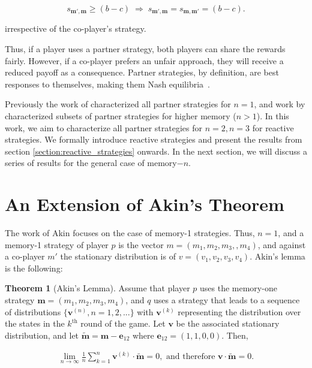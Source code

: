 \documentclass{article}
\theoremstyle{definition}
\newtheorem{theorem}{Theorem}[section]
\begin{document}
\begin{equation}\label{Eq:Partner}
    s_{\mathbf{m'},\mathbf{m}} \geq (b - c) \; \Rightarrow \; s_{\mathbf{m'},\mathbf{m}} = s_{\mathbf{m},\mathbf{m'}} = (b - c).
\end{equation}

irrespective of the co-player's strategy.

Thus, if a player uses a partner strategy, both players can share the rewards
fairly. However, if a co-player prefers an unfair approach, they will receive a
reduced payoff as a consequence. Partner strategies, by definition, are best
responses to themselves, making them Nash equilibria~\cite{Hilbe:GEB:2015}.

Previously the work of \citep{akin:EGADS:2016} characterized all partner
strategies for $n=1$, and work by \citep{hilbe:PNAS:2017} characterized subsets
of partner strategies for higher memory ($n >1$).  In this work, we aim to
characterize all partner strategies for $n=2, n=3$ for reactive strategies. We
formally introduce reactive strategies and present the results from section
\ref{section:reactive_strategies} onwards. In the next section, we will discuss
a series of results for the general case of memory$-n$.

\section{An Extension of Akin's Theorem}

The work of Akin focuses on the case of memory-1 strategies. Thus, $n=1$, and a
memory-1 strategy of player $p$ is the vector $m = (m_1, m_2, m_3, ,m_4)$, and
against a co-player $m'$ the stationary distribution is of $v = (v_1, v_2, v_3,
v_4)$. Akin's lemma is the following:

\begin{theorem}[Akin's Lemma]\label{theorem:akin} Assume that player \(p\) uses
    the memory-one strategy \(\mathbf{m}=(m_1, m_2, m_3, m_4)\), and \(q\) uses
    a strategy that leads to a sequence of distributions \(\{\mathbf{v}^{(n)}, n
    = 1, 2, ...\}\) with \(\mathbf{v}^{(k)}\) representing the distribution over
    the states in the \(k^{\text{th}}\) round of the game. Let  \(\mathbf{v}\)
    be the associated stationary distribution, and let \(\mathbf{\tilde{m}} =
    \mathbf{m} - \mathbf{e}_{12}\) where \(\mathbf{e}_{12} = (1, 1, 0, 0)\).
    Then,
  
    \begin{align}
      \lim_{n \rightarrow \infty} \frac{1}{n} \sum_{k=1}^{n} \mathbf{v}^{(k)} \cdot \mathbf{\tilde{m}} = 0, \text{ and therefore } \mathbf{v} \cdot \mathbf{\tilde{m}} = 0.
    \end{align}
\end{theorem}
\end{document}
